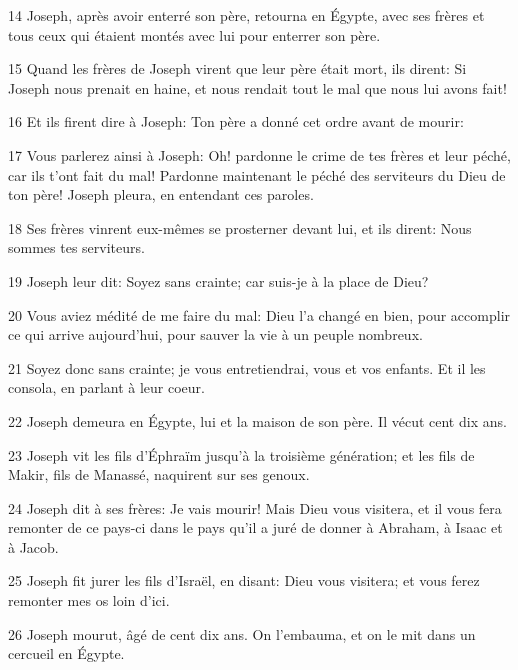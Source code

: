 \par 14 Joseph, après avoir enterré son père, retourna en Égypte, avec ses frères et tous ceux qui étaient montés avec lui pour enterrer son père.
\par 15 Quand les frères de Joseph virent que leur père était mort, ils dirent: Si Joseph nous prenait en haine, et nous rendait tout le mal que nous lui avons fait!
\par 16 Et ils firent dire à Joseph: Ton père a donné cet ordre avant de mourir:
\par 17 Vous parlerez ainsi à Joseph: Oh! pardonne le crime de tes frères et leur péché, car ils t'ont fait du mal! Pardonne maintenant le péché des serviteurs du Dieu de ton père! Joseph pleura, en entendant ces paroles.
\par 18 Ses frères vinrent eux-mêmes se prosterner devant lui, et ils dirent: Nous sommes tes serviteurs.
\par 19 Joseph leur dit: Soyez sans crainte; car suis-je à la place de Dieu?
\par 20 Vous aviez médité de me faire du mal: Dieu l'a changé en bien, pour accomplir ce qui arrive aujourd'hui, pour sauver la vie à un peuple nombreux.
\par 21 Soyez donc sans crainte; je vous entretiendrai, vous et vos enfants. Et il les consola, en parlant à leur coeur.
\par 22 Joseph demeura en Égypte, lui et la maison de son père. Il vécut cent dix ans.
\par 23 Joseph vit les fils d'Éphraïm jusqu'à la troisième génération; et les fils de Makir, fils de Manassé, naquirent sur ses genoux.
\par 24 Joseph dit à ses frères: Je vais mourir! Mais Dieu vous visitera, et il vous fera remonter de ce pays-ci dans le pays qu'il a juré de donner à Abraham, à Isaac et à Jacob.
\par 25 Joseph fit jurer les fils d'Israël, en disant: Dieu vous visitera; et vous ferez remonter mes os loin d'ici.
\par 26 Joseph mourut, âgé de cent dix ans. On l'embauma, et on le mit dans un cercueil en Égypte.


